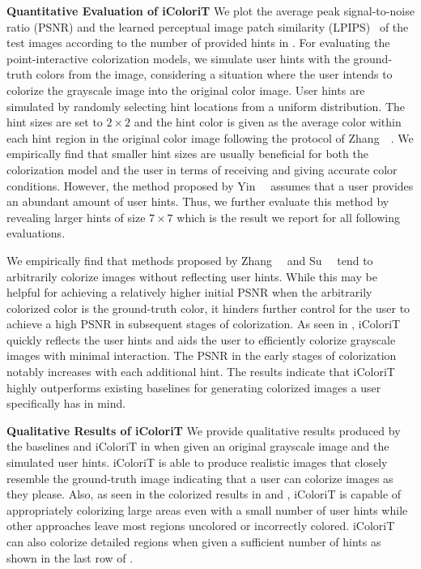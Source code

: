 \documentclass[10pt,twocolumn,letterpaper]{article}
\begin{document}
\noindent \textbf{Quantitative Evaluation of iColoriT}
We plot the average peak signal-to-noise ratio (PSNR) and the learned perceptual image patch similarity (LPIPS)~\cite{lpips} of the test images according to the number of provided hints in . 
For evaluating the point-interactive colorization models, we simulate user hints with the ground-truth colors from the image, considering a situation where the user intends to colorize the grayscale image into the original color image. 
User hints are simulated by randomly selecting hint locations from a uniform distribution. 
The hint sizes are set to $2\times 2$ and the hint color is given as the average color within each hint region in the original color image following the protocol of Zhang~\etal~\cite{zhang2017}. 
We empirically find that smaller hint sizes are usually beneficial for both the colorization model and the user in terms of receiving and giving accurate color conditions. 
However, the method proposed by Yin~\etal~\cite{side} assumes that a user provides an abundant amount of user hints. 
Thus, we further evaluate this method by revealing larger hints of size $7\times 7$ which is the result we report for all following evaluations. 

We empirically find that methods proposed by Zhang~\etal~\cite{zhang2017} and Su~\etal~\cite{instanceaware} tend to arbitrarily colorize images without reflecting user hints.
While this may be helpful for achieving a relatively higher initial PSNR when the arbitrarily colorized color is the ground-truth color, it hinders further control for the user to achieve a high PSNR in subsequent stages of colorization. 
As seen in , iColoriT quickly reflects the user hints and aids the user to efficiently colorize grayscale images with minimal interaction. 
The PSNR in the early stages of colorization notably increases with each additional hint. 
The results indicate that iColoriT highly outperforms existing baselines for generating colorized images a user specifically has in mind. 


\noindent \textbf{Qualitative Results of iColoriT}
\label{sec:quali}
We provide qualitative results produced by the baselines and iColoriT in  when given an original grayscale image and the simulated user hints. 
iColoriT is able to produce realistic images that closely resemble the ground-truth image indicating that a user can colorize images as they please. 
Also, as seen in the colorized results in  and , iColoriT is capable of appropriately colorizing large areas even with a small number of user hints while other approaches leave most regions uncolored or incorrectly colored. 
iColoriT can also colorize detailed regions when given a sufficient number of hints as shown in the last row of .
\end{document}
